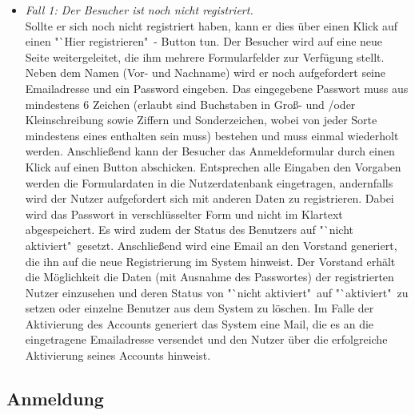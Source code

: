 \documentclass[fontsize = 12pt, paper = a4]{scrreprt}
\begin{document}
\begin{itemize}

\item \textit{Fall 1: Der Besucher ist noch nicht registriert.} \\
Sollte er sich noch nicht registriert haben, kann er dies über einen Klick auf einen "`Hier registrieren"\ - Button tun. Der Besucher wird auf eine neue Seite weitergeleitet, die ihm mehrere Formularfelder zur Verfügung stellt. Neben dem Namen (Vor- und Nachname) wird er noch aufgefordert seine Emailadresse und ein Password eingeben. Das eingegebene Passwort muss aus mindestens 6 Zeichen (erlaubt sind Buchstaben in Groß- und /oder Kleinschreibung sowie Ziffern und Sonderzeichen, wobei von jeder Sorte mindestens eines enthalten sein muss) bestehen und muss einmal wiederholt werden. Anschließend kann der Besucher das Anmeldeformular durch einen Klick auf einen Button abschicken. Entsprechen alle Eingaben den Vorgaben werden die Formulardaten in die Nutzerdatenbank eingetragen, andernfalls wird der Nutzer aufgefordert sich mit anderen Daten zu registrieren. Dabei wird das Passwort in verschlüsselter Form und nicht im Klartext abgespeichert. Es wird zudem der Status des Benutzers auf "`nicht aktiviert"\ gesetzt. Anschließend wird eine Email an den Vorstand generiert, die ihn auf die neue Registrierung im System hinweist. Der Vorstand erhält die Möglichkeit die Daten (mit Ausnahme des Passwortes) der registrierten Nutzer einzusehen und deren Status von "`nicht aktiviert"\ auf "`aktiviert"\ zu setzen oder einzelne Benutzer aus dem System zu löschen. Im Falle der Aktivierung des Accounts generiert das System eine Mail, die es an die eingetragene Emailadresse versendet und den Nutzer über die erfolgreiche Aktivierung seines Accounts hinweist.

\end{itemize}

\subsection{Anmeldung}
\end{document}
